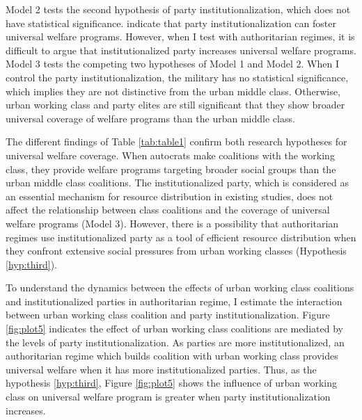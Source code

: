 \documentclass[12pt, letterpage, notitlepage]{article}
\begin{document}
Model 2 tests the second hypothesis of party institutionalization, which does not have statistical significance. \citet[16]{Rasmussen2019} indicate that party institutionalization can foster universal welfare programs. However, when I test with authoritarian regimes, it is difficult to argue that institutionalized party increases universal welfare programs. Model 3 tests the competing two hypotheses of Model 1 and Model 2. When I control the party institutionalization, the military has no statistical significance, which implies they are not distinctive from the urban middle class. Otherwise, urban working class and party elites are still significant that they show broader universal coverage of welfare programs than the urban middle class.





The different findings of Table \ref{tab:table1} confirm both research hypotheses for universal welfare coverage. When autocrats make coalitions with the working class, they provide welfare programs targeting broader social groups than the urban middle class coalitions. The institutionalized party, which is considered as an essential mechanism for resource distribution in existing studies, does not affect the relationship between class coalitions and the coverage of universal welfare programs (Model 3). However, there is a possibility that authoritarian regimes use institutionalized party as a tool of efficient resource distribution when they confront extensive social pressures from urban working classes (Hypothesis \ref{hyp:third}).%




To understand the dynamics between the effects of urban working class coalitions and institutionalized parties in authoritarian regime, I estimate the interaction between urban working class coalition and party institutionalization. Figure \ref{fig:plot5} indicates the effect of urban working class coalitions are mediated by the levels of party institutionalization. As parties are more institutionalized, an authoritarian regime which builds coalition with urban working class provides universal welfare when it has more institutionalized parties. Thus, as the hypothesis \ref{hyp:third}, Figure \ref{fig:plot5} shows the influence of urban working class on universal welfare program is greater when party institutionalization increases.
\end{document}

